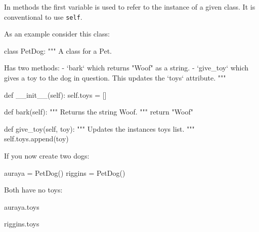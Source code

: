 In methods the first variable is used to refer to the instance of a given class.
It is conventional to use \texttt{self}.


As an example consider this class:




\begin{pyin}
class PetDog:
    """
    A class for a Pet.

    Has two methods:
        - `bark` which returns "Woof" as a string.
        - `give_toy` which gives a toy to the dog in question. This updates the
          `toys` attribute.
    """

    def __init__(self):
        self.toys = []

    def bark(self):
        """
        Returns the string Woof.
        """
        return "Woof"

    def give_toy(self, toy):
        """
        Updates the instances toys list.
        """
        self.toys.append(toy)
\end{pyin}





If you now create two dogs:




\begin{pyin}
auraya = PetDog()
riggins = PetDog()
\end{pyin}





Both have no toys:




\begin{pyin}
auraya.toys
\end{pyin}





\begin{raw}
[]
\end{raw}







\begin{pyin}
riggins.toys
\end{pyin}





\begin{raw}
[]
\end{raw}





